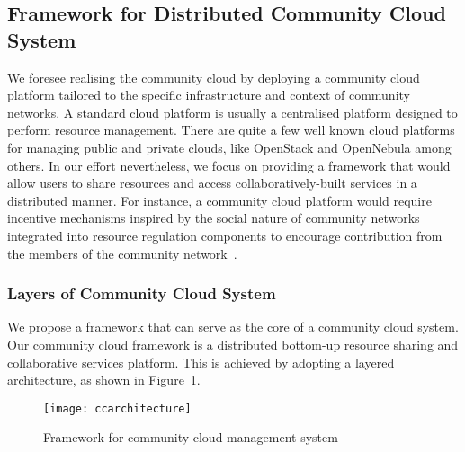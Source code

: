 

\subsection{Framework for Distributed Community Cloud System}
\label{sec:design-architecture}

We foresee realising the community cloud by deploying a community cloud platform tailored to the specific infrastructure and context of community networks. A standard cloud platform is usually a centralised platform designed to perform resource management. There are quite a few well known cloud platforms for managing public and private clouds, like OpenStack \cite{OpenStack} and OpenNebula \cite{OpenNebula} among others. 
In our effort nevertheless, we focus on providing a framework that would allow users to share resources and access collaboratively-built services in a distributed manner.
For instance, a community cloud platform would require incentive mechanisms inspired by the social nature of community networks integrated into resource regulation components to encourage contribution from the members of the community network~\cite{Khan2015Incentive}.

\subsubsection{Layers of Community Cloud System}
We propose a framework that can serve as the core of a community cloud system. Our community cloud framework is a distributed bottom-up resource sharing and collaborative services platform.
This is achieved by adopting a layered architecture, as shown in Figure~\ref{fig:cloud-architecture}. 

\begin{figure}[tbp]
	\centering
	\texttt{[image: ccarchitecture]} 
	\caption{Framework for community cloud management system}
	\label{fig:cloud-architecture}
\end{figure}


